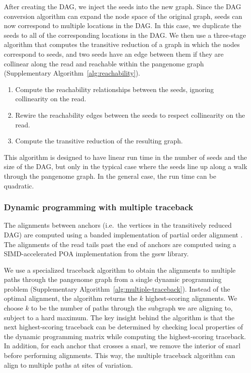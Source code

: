 \documentclass[11pt]{ucthesis}
\begin{document}
After creating the DAG, we inject the seeds into the new graph. Since the DAG conversion algorithm can expand the node space of the original graph, seeds can now correspond to multiple locations in the DAG. In this case, we duplicate the seeds to all of the corresponding locations in the DAG.  We then use a three-stage algorithm that computes the transitive reduction of a graph in which the nodes correspond to seeds, and two seeds have an edge between them if they are collinear along the read and reachable within the pangenome graph (Supplementary Algorithm~\ref{alg:reachability}). 

\begin{enumerate}
    \item Compute the reachability relationships between the seeds, ignoring collinearity on the read.
    \item Rewire the reachability edges between the seeds to respect collinearity on the read.
    \item Compute the transitive reduction of the resulting graph.
\end{enumerate}

This algorithm is designed to have linear run time in the number of seeds and the size of the DAG, but only in the typical case where the seeds line up along a walk through the pangenome graph. In the general case, the run time can be quadratic.

\subsubsection{Dynamic programming with multiple traceback}

The alignments between anchors (i.e.\ the vertices in the transitively reduced DAG) are computed using a banded implementation of partial order alignment \cite{lee2002multiple}. The alignments of the read tails past the end of anchors are computed using a SIMD-accelerated POA implementation from the gssw library. 
	
We use a specialized traceback algorithm to obtain the alignments to multiple paths through the pangenome graph from a single dynamic programming problem (Supplementary Algorithm~\ref{alg:multiple-traceback}). Instead of the optimal alignment, the algorithm returns the $k$ highest-scoring alignments. We choose $k$ to be the number of paths through the subgraph we are aligning to, subject to a hard maximum. The key insight behind the algorithm is that the next highest-scoring traceback can be determined by checking local properties of the dynamic programming matrix while computing the highest-scoring traceback. In addition, for each anchor that crosses a snarl, we remove the interior of snarl before performing alignments. This way, the multiple traceback algorithm can align to multiple paths at sites of variation.
\end{document}
